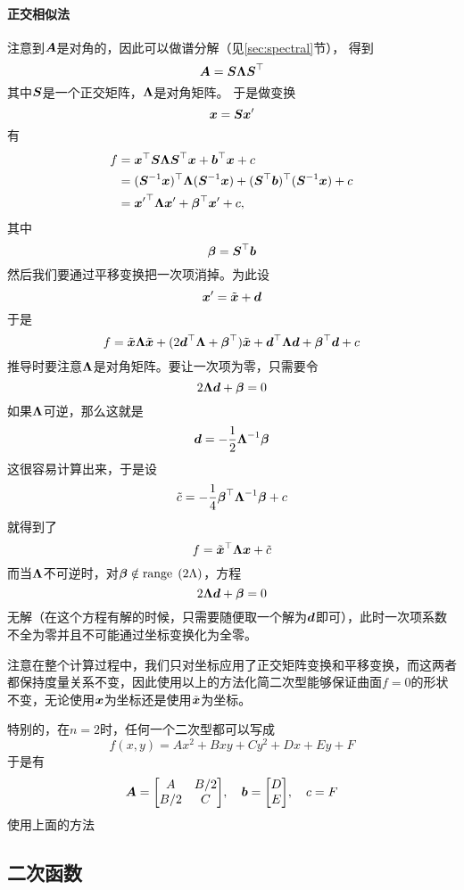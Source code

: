 \documentclass[UTF8]{ctexart}
\newcommand*{\range}{\mathrm{range}\;}
\theoremstyle{definition}
\begin{document}
\paragraph{正交相似法} 注意到$\vb*{A}$是对角的，因此可以做谱分解（见\ref{sec:spectral}节），
得到
\[
    \vb*{A} = \vb*{S} \vb*{\Lambda} \vb*{S}^\top
\]
其中$\vb*{S}$是一个正交矩阵，$\vb*{\Lambda}$是对角矩阵。
于是做变换
\[
    \vb*{x} = \vb*{S} \vb*{x}'
\]
有
\[
    \begin{aligned}
        f &= \vb*{x}^\top \vb*{S} \vb*{\Lambda} \vb*{S}^\top \vb*{x} + \vb*{b}^\top \vb*{x} + c \\
        &= (\vb*{S}^{-1} \vb*{x})^\top \vb*{\Lambda} (\vb*{S}^{-1} \vb*{x}) + (\vb*{S}^\top \vb*{b})^\top (\vb*{S}^{-1} \vb*{x}) + c \\
        &= {\vb*{x}'}^\top \vb*{\Lambda} \vb*{x}' + \vb*{\beta}^\top \vb*{x}' + c,
    \end{aligned}
\]
其中
\[
    \vb*{\beta} = \vb*{S}^\top \vb*{b}
\]
然后我们要通过平移变换把一次项消掉。为此设
\[
    \vb*{x}' = \tilde{\vb*{x}} + \vb*{d}
\]
于是
\[
    f = \tilde{\vb*{x}} \vb*{\Lambda} \tilde{\vb*{x}} + (2 \vb*{d}^\top \vb*{\Lambda} + \vb*{\beta}^\top) \tilde{\vb*{x}} + \vb*{d}^\top \vb*{\Lambda} \vb*{d} + \vb*{\beta}^\top \vb*{d} + c
\]
推导时要注意$\vb*{\Lambda}$是对角矩阵。要让一次项为零，只需要令
\[
    2 \vb*{\Lambda} \vb*{d} + \vb*{\beta} = 0
\]
如果$\vb*{\Lambda}$可逆，那么这就是
\[
    \vb*{d} = - \frac{1}{2} \vb*{\Lambda}^{-1} \vb*{\beta}
\]
这很容易计算出来，于是设
\[
    \tilde{c} = -\frac{1}{4} \vb*{\beta}^\top \vb*{\Lambda}^{-1} \vb*{\beta} + c
\]
就得到了
\[
    f = \tilde{\vb*{x}}^\top \vb*{\Lambda} \vb*{x} + \tilde{c}
\]
而当$\vb*{\Lambda}$不可逆时，对$\vb*{\beta} \notin \range\left(2\Lambda\right)$，方程
\[
    2 \vb*{\Lambda} \vb*{d} + \vb*{\beta} = 0
\]
无解（在这个方程有解的时候，只需要随便取一个解为$\vb*{d}$即可），此时一次项系数不全为零并且不可能通过坐标变换化为全零。

注意在整个计算过程中，我们只对坐标应用了正交矩阵变换和平移变换，而这两者都保持度量关系不变，因此使用以上的方法化简二次型能够保证曲面$f=0$的形状不变，无论使用$\vb*{x}$为坐标还是使用$\tilde{\vb*{x}}$为坐标。

特别的，在$n=2$时，任何一个二次型都可以写成
\[
    f(x, y) = Ax^2 + Bxy + Cy^2 + Dx + Ey + F
\]
于是有
\[
    \vb*{A} = \mqty[A & B/2 \\ B/2 & C], \quad \vb*{b} = \mqty[D \\ E], \quad c = F
\]
使用上面的方法

\subsection{二次函数}
\end{document}
